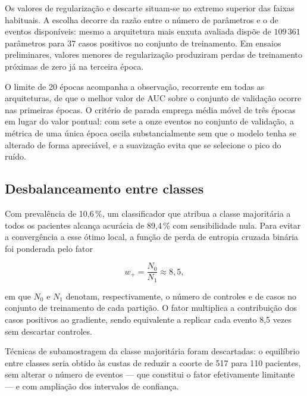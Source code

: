 
Os valores de regularização e descarte situam-se no extremo superior das
faixas habituais. A escolha decorre da razão entre o número de parâmetros e
o de eventos disponíveis: mesmo a arquitetura mais enxuta avaliada dispõe de
$109\,361$ parâmetros para 37 casos positivos no conjunto de treinamento. Em
ensaios preliminares, valores menores de regularização produziram perdas de
treinamento próximas de zero já na terceira época.

O limite de 20 épocas acompanha a observação, recorrente em todas as
arquiteturas, de que o melhor valor de \gls{AUC} sobre o conjunto de
validação ocorre nas primeiras épocas. O critério de parada emprega média
móvel de três épocas em lugar do valor pontual: com sete a onze eventos no
conjunto de validação, a métrica de uma única época oscila substancialmente
sem que o modelo tenha se alterado de forma apreciável, e a suavização evita
que se selecione o pico do ruído.

\subsection{Desbalanceamento entre classes}
\label{subsec:config-desbalanceamento}

Com prevalência de 10,6\,\%, um classificador que atribua a classe
majoritária a todos os pacientes alcança acurácia de 89,4\,\% com
sensibilidade nula. Para evitar a convergência a esse ótimo local, a função
de perda de entropia cruzada binária foi ponderada pelo fator

\begin{equation}
	w_{+} = \frac{N_0}{N_1} \approx 8{,}5,
	\label{eq:pos-weight}
\end{equation}

\noindent
em que $N_0$ e $N_1$ denotam, respectivamente, o número de controles e de
casos no conjunto de treinamento de cada partição. O fator multiplica a
contribuição dos casos positivos ao gradiente, sendo equivalente a replicar
cada evento 8,5 vezes sem descartar controles.

Técnicas de subamostragem da classe majoritária foram descartadas: o
equilíbrio entre classes seria obtido às custas de reduzir a coorte de 517
para 110 pacientes, sem alterar o número de eventos --- que constitui o
fator efetivamente limitante --- e com ampliação dos intervalos de confiança.

